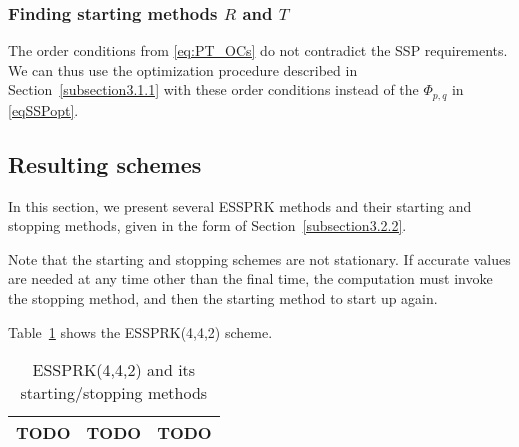 

\subsubsection{Finding starting methods $ R $ and $ T $}\label{subsection3.2.3}


The order conditions from \eqref{eq:PT_OCs} do not contradict the SSP
requirements.  We can thus use the optimization procedure described in
Section~\ref{subsection3.1.1} with these order conditions instead of
the $\Phi_{p,q}$ in \eqref{eqSSPopt}.  


\subsection{Resulting schemes}

In this section, we present several ESSPRK methods and their starting
and stopping methods, given in the form of
Section~\ref{subsection3.2.2}.

Note that the starting and stopping schemes are not stationary.  If
accurate values are needed at any time other than the final time, the
computation must invoke the stopping method, and then the starting method to start up again. 

Table~\ref{tab:essprk442} shows the ESSPRK(4,4,2) scheme.

\begin{table}
  \caption{ESSPRK(4,4,2) and its starting/stopping methods}
  \label{tab:essprk442}
  \centering
  \begin{tabular}{|c|c|c|}
    \hline
    TODO & TODO & TODO \\
    \hline
  \end{tabular}
\end{table}
